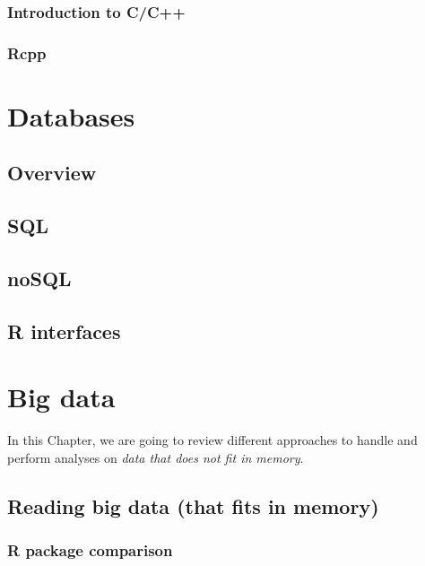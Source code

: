 \documentclass[]{book}
\theoremstyle{definition}
\theoremstyle{definition}
\theoremstyle{definition}
\theoremstyle{remark}
\begin{document}
\subsection{Introduction to C/C++}\label{introduction-to-cc}

\subsection{Rcpp}\label{rcpp}

\chapter{Databases}\label{databases}

\section{Overview}\label{overview}

\section{SQL}\label{sql}

\section{noSQL}\label{nosql}

\section{R interfaces}\label{r-interfaces}

\chapter{Big data}\label{bigdata}

In this Chapter, we are going to review different approaches to handle
and perform analyses on \emph{data that does not fit in memory}.

\section{Reading big data (that fits in
memory)}\label{reading-big-data-that-fits-in-memory}

\subsection{R package comparison}\label{r-package-comparison}
\end{document}
